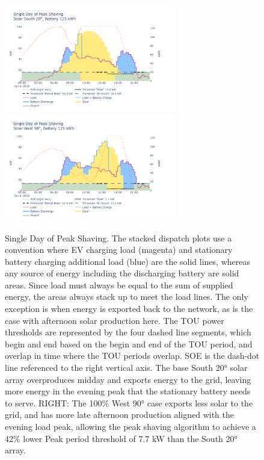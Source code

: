 \documentclass[
]{article}
\begin{document}
\begin{figure}[!h]
  \centering
  \includegraphics[width=7.5cm,height=\textheight]{./images/single day of peak shaving south.png}
  \includegraphics[width=7.5cm,height=\textheight]{./images/single day of peak shaving west.png}
  \caption{Single Day of Peak Shaving. The stacked
  dispatch plots use a convention where EV charging load (magenta) and
  stationary battery charging additional load (blue) are the solid lines,
  whereas any source of energy including the discharging battery are solid
  areas. Since load must always be equal to the sum of supplied energy,
  the areas always stack up to meet the load lines. The only exception is
  when energy is exported back to the network, as is the case with
  afternoon solar production here. The TOU power thresholds are
  represented by the four dashed line segments, which begin and end based
  on the begin and end of the TOU period, and overlap in time where the
  TOU periods overlap. SOE is the dash-dot line referenced to the right
  vertical axis. The base South 20° solar array overproduces midday
  and exports energy to the grid, leaving more energy in the evening peak
  that the stationary battery needs to serve.
  RIGHT: The 100\% West 90°
  case exports less solar to the grid, and has more late afternoon
  production aligned with the evening load peak, allowing the peak shaving
  algorithm to achieve a 42\% lower Peak period threshold of 7.7 kW than
  the South 20° array.}
  \label{fig:peak-shaving}
\end{figure}
\end{document}
